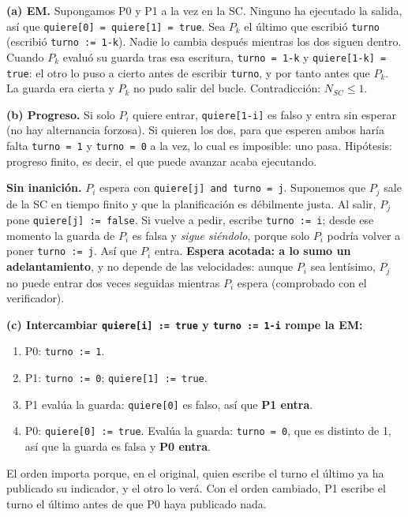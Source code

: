 \documentclass[11pt,a4paper,oneside]{report}
\begin{document}
\begin{solucion}
\textbf{(a) EM.} Supongamos P0 y P1 a la vez en la SC. Ninguno ha ejecutado la salida, así que
\texttt{quiere[0] = quiere[1] = true}. Sea $P_k$ el último que escribió \texttt{turno} (escribió
\texttt{turno := 1-k}). Nadie lo cambia después mientras los dos siguen dentro. Cuando $P_k$ evaluó su guarda tras
esa escritura, \texttt{turno = 1-k} y \texttt{quiere[1-k] = true}: el otro lo puso a cierto antes de escribir
\texttt{turno}, y por tanto antes que $P_k$. La guarda era cierta y $P_k$ no pudo salir del bucle.
Contradicción: $N_{SC} \le 1$.

\textbf{(b) Progreso.} Si solo $P_i$ quiere entrar, \texttt{quiere[1-i]} es falso y entra sin esperar (no hay
alternancia forzosa). Si quieren los dos, para que esperen ambos haría falta \texttt{turno = 1} y
\texttt{turno = 0} a la vez, lo cual es imposible: uno pasa. Hipótesis: progreso finito, es decir, el que puede
avanzar acaba ejecutando.

\textbf{Sin inanición.} $P_i$ espera con \texttt{quiere[j] and turno = j}. Suponemos que $P_j$ sale de la SC en
tiempo finito y que la planificación es débilmente justa. Al salir, $P_j$ pone \texttt{quiere[j] := false}. Si
vuelve a pedir, escribe \texttt{turno := i}; desde ese momento la guarda de $P_i$ es falsa y \emph{sigue siéndolo},
porque solo $P_i$ podría volver a poner \texttt{turno := j}. Así que $P_i$ entra. \textbf{Espera acotada: a lo sumo
un adelantamiento}, y no depende de las velocidades: aunque $P_i$ sea lentísimo, $P_j$ no puede entrar dos veces
seguidas mientras $P_i$ espera (comprobado con el verificador).

\textbf{(c) Intercambiar \texttt{quiere[i] := true} y \texttt{turno := 1-i} rompe la EM:}
\begin{enumerate}[leftmargin=*,noitemsep]
  \item P0: \texttt{turno := 1}.
  \item P1: \texttt{turno := 0}; \texttt{quiere[1] := true}.
  \item P1 evalúa la guarda: \texttt{quiere[0]} es falso, así que \textbf{P1 entra}.
  \item P0: \texttt{quiere[0] := true}. Evalúa la guarda: \texttt{turno = 0}, que es distinto de 1, así que la
        guarda es falsa y \textbf{P0 entra}.
\end{enumerate}
El orden importa porque, en el original, quien escribe el turno el último ya ha publicado su indicador, y el otro
lo verá. Con el orden cambiado, P1 escribe el turno el último antes de que P0 haya publicado nada.


\end{solucion}
\end{document}
